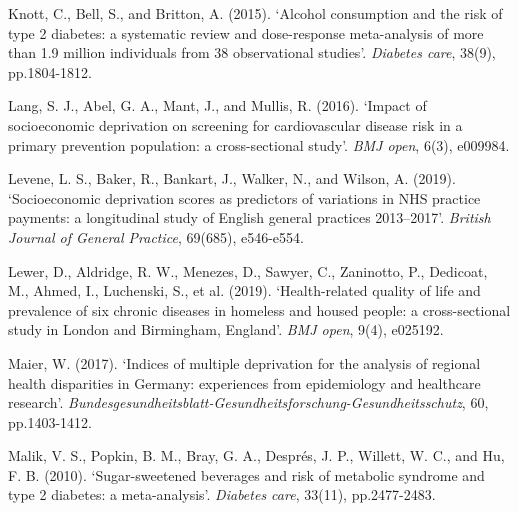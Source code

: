 \begin{Reference}
\begin{flushleft}
Knott, C., Bell, S., and Britton, A. (2015). `Alcohol consumption and the risk of type 2 diabetes: a systematic review and dose-response meta-analysis of more than 1.9 million individuals from 38 observational studies'. \textit{Diabetes care}, 38(9), pp.1804-1812.
\end{flushleft}
\vspace{2pt}


\begin{flushleft}
Lang, S. J., Abel, G. A., Mant, J., and Mullis, R. (2016). `Impact of socioeconomic deprivation on screening for cardiovascular disease risk in a primary prevention population: a cross-sectional study'. \textit{BMJ open}, 6(3), e009984.
\end{flushleft}
\vspace{2pt}


\begin{flushleft}
Levene, L. S., Baker, R., Bankart, J., Walker, N., and Wilson, A. (2019). `Socioeconomic deprivation scores as predictors of variations in NHS practice payments: a longitudinal study of English general practices 2013–2017'. \textit{British Journal of General Practice}, 69(685), e546-e554.
\end{flushleft}
\vspace{2pt}


\begin{flushleft}
Lewer, D., Aldridge, R. W., Menezes, D., Sawyer, C., Zaninotto, P., Dedicoat, M., Ahmed, I., Luchenski, S., et al. (2019). `Health-related quality of life and prevalence of six chronic diseases in homeless and housed people: a cross-sectional study in London and Birmingham, England'. \textit{BMJ open}, 9(4), e025192.
\end{flushleft}
\vspace{2pt}


\begin{flushleft}
Maier, W. (2017). `Indices of multiple deprivation for the analysis of regional health disparities in Germany: experiences from epidemiology and healthcare research'. \textit{Bundesgesundheitsblatt-Gesundheitsforschung-Gesundheitsschutz}, 60, pp.1403-1412.
\end{flushleft}
\vspace{2pt}


\begin{flushleft}
Malik, V. S., Popkin, B. M., Bray, G. A., Després, J. P., Willett, W. C., and Hu, F. B. (2010). `Sugar-sweetened beverages and risk of metabolic syndrome and type 2 diabetes: a meta-analysis'. \textit{Diabetes care}, 33(11), pp.2477-2483.
\end{flushleft}
\vspace{2pt}



\end{Reference}
